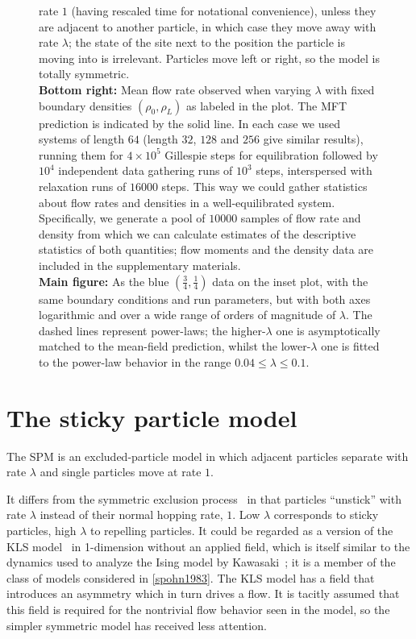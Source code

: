 \documentclass[
reprint, amsmath,amssymb, aps,
 pre, longbibliography,
]{revtex4-1}
\begin{document}
\begin{figure}[h!]
{  rate $1$ (having rescaled time for notational convenience), unless
  they are adjacent to another particle, in
  which case they move away with rate $\lambda$; the state of the site next
  to the position the particle is moving into is irrelevant.
  Particles move left or right, so the
  model is totally symmetric.\\ \textbf{Bottom right:} Mean flow rate
  observed when varying $\lambda$ with fixed boundary densities
  $(\rho_0, \rho_L)$ as labeled in the plot.  The MFT
  prediction is indicated by the solid line.  In each case we used
  systems of length $64$ (length $32$, $128$ and $256$ give similar
  results), running them for $4\times10^5$ Gillespie steps for
  equilibration followed by $10^4$ independent data gathering runs of
  $10^3$ steps, interspersed with relaxation runs of $16000$
  steps. This way we could gather statistics about flow rates and
  densities in a well-equilibrated system. Specifically, we generate a
  pool of $10000$ samples of flow rate and density from which we can
  calculate estimates of the descriptive statistics of both
  quantities; flow moments and the density data are included in the
  supplementary materials.\\ \textbf{Main figure:} As the blue $\left(
  \frac{3}{4} , \frac{1}{4} \right)$ data on the inset plot, with the
  same boundary conditions and run parameters, but with both axes
  logarithmic and over a wide range of orders of magnitude of
  $\lambda$.  The dashed lines represent power-laws; the
  higher-$\lambda$ one is asymptotically matched to the mean-field
  prediction, whilst the lower-$\lambda$ one is fitted to the
  power-law behavior in the range $0.04 \le \lambda \le 0.1$.
\vspace{1em}}
\end{figure}
\fi



\section{The sticky particle model} \label{sec:modelDefn}

The SPM is an excluded-particle model in which adjacent particles
separate with rate $\lambda$ and single particles move at rate $1$.


It differs from the symmetric exclusion
process~\cite{sugden2007dynamically, Kollmann2003, Lin2005,
  Hegde2014,Krapivsky2014, Imamura2017} in that particles ``unstick''
with rate $\lambda$ instead of their normal hopping rate, $1$.  Low
$\lambda$ corresponds to sticky particles, high $\lambda$ to repelling
particles.
It could be regarded as a version of the KLS model~\cite{Katz1984,
  Zia2010, Kafri2003} in 1-dimension without an applied field, which
is itself similar to the dynamics used to analyze the Ising model by
Kawasaki~\cite{PhysRev.145.224}; it is a member of the class of models considered in
\ref{spohn1983}.  The KLS model has a field that
introduces an asymmetry which in turn drives a flow.  It is tacitly assumed
that this field is required for the nontrivial flow behavior seen in
the model, so the simpler symmetric model has received less attention.
\end{document}
